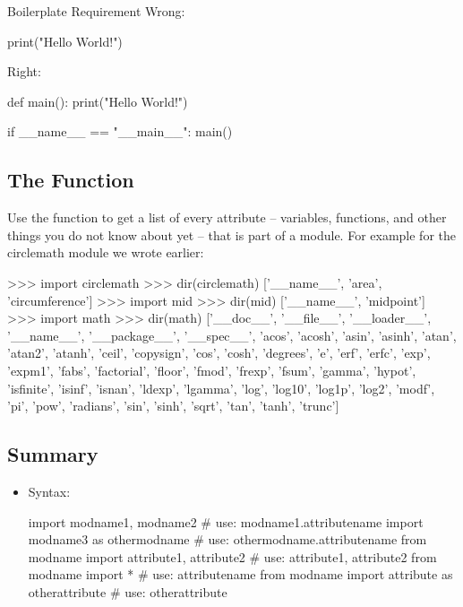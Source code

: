 \documentclass[11pt]{cselabheader}
\begin{document}
{\begin{infobox}{Boilerplate Requirement}
  Wrong:

  \begin{python3code}
print("Hello World!")
  \end{python3code}

  Right:

  \begin{python3code}
def main():
    print("Hello World!")

if __name__ == "__main__":
    main()
  \end{python3code}
\end{infobox}

\subsection{The \protect{} Function}

Use the  function to get a list of every attribute --
variables, functions, and other things you do not know about yet -- that is part
of a module. For example for the circlemath module we wrote earlier:

\begin{pyconcode}
>>> import circlemath
>>> dir(circlemath)
['__name__', 'area', 'circumference']
>>> import mid
>>> dir(mid)
['__name__', 'midpoint']
>>> import math
>>> dir(math)
['__doc__', '__file__', '__loader__', '__name__', '__package__', '__spec__', 'acos',
'acosh', 'asin', 'asinh', 'atan', 'atan2', 'atanh', 'ceil', 'copysign', 'cos', 'cosh',
'degrees', 'e', 'erf', 'erfc', 'exp', 'expm1', 'fabs', 'factorial', 'floor', 'fmod',
'frexp', 'fsum', 'gamma', 'hypot', 'isfinite', 'isinf', 'isnan', 'ldexp', 'lgamma',
'log', 'log10', 'log1p', 'log2', 'modf', 'pi', 'pow', 'radians', 'sin', 'sinh', 'sqrt',
'tan', 'tanh', 'trunc']
\end{pyconcode}

\pagebreak
\subsection{Summary}
\label{subsec:modules.sum}

\begin{itemize}
  \item Syntax:

    \begin{python3code}
import modname1, modname2 # use: modname1.attributename
import modname3 as othermodname # use: othermodname.attributename
from modname import attribute1, attribute2 # use: attribute1, attribute2
from modname import * # use: attributename
from modname import attribute as otherattribute # use: otherattribute
    \end{python3code}


\end{itemize}}
\end{document}
